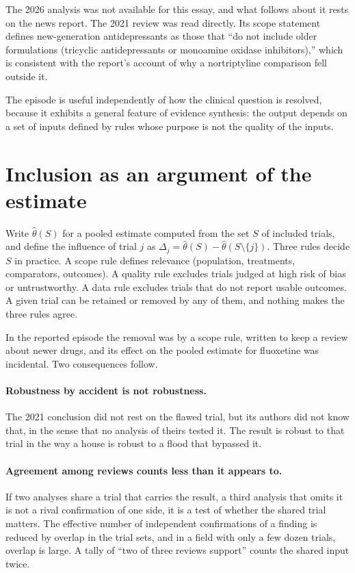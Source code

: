 \documentclass[11pt]{article}
\theoremstyle{definition}
\begin{document}
The 2026 analysis was not available for this essay, and what follows about it rests on the news report. The 2021 review was read directly. Its scope statement defines new-generation antidepressants as those that ``do not include older formulations (tricyclic antidepressants or monoamine oxidase inhibitors),'' which is consistent with the report's account of why a nortriptyline comparison fell outside it.

The episode is useful independently of how the clinical question is resolved, because it exhibits a general feature of evidence synthesis: the output depends on a set of inputs defined by rules whose purpose is not the quality of the inputs.

\section{Inclusion as an argument of the estimate}

Write $\hat\theta(S)$ for a pooled estimate computed from the set $S$ of included trials, and define the influence of trial $j$ as $\Delta_j=\hat\theta(S)-\hat\theta(S\setminus\{j\})$. Three rules decide $S$ in practice. A scope rule defines relevance (population, treatments, comparators, outcomes). A quality rule excludes trials judged at high risk of bias or untrustworthy. A data rule excludes trials that do not report usable outcomes. A given trial can be retained or removed by any of them, and nothing makes the three rules agree.

In the reported episode the removal was by a scope rule, written to keep a review about newer drugs, and its effect on the pooled estimate for fluoxetine was incidental. Two consequences follow.

\paragraph{Robustness by accident is not robustness.} The 2021 conclusion did not rest on the flawed trial, but its authors did not know that, in the sense that no analysis of theirs tested it. The result is robust to that trial in the way a house is robust to a flood that bypassed it.

\paragraph{Agreement among reviews counts less than it appears to.} If two analyses share a trial that carries the result, a third analysis that omits it is not a rival confirmation of one side, it is a test of whether the shared trial matters. The effective number of independent confirmations of a finding is reduced by overlap in the trial sets, and in a field with only a few dozen trials, overlap is large. A tally of ``two of three reviews support'' counts the shared input twice.
\end{document}
